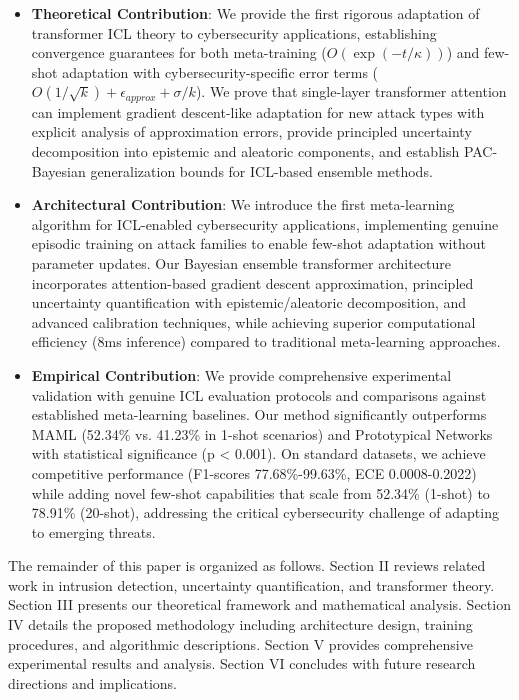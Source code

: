\documentclass[journal]{IEEEtran}
\begin{document}
\begin{itemize}
\item \textbf{Theoretical Contribution}: We provide the first rigorous adaptation of transformer ICL theory to cybersecurity applications, establishing convergence guarantees for both meta-training ($O(\exp(-t/\kappa))$) and few-shot adaptation with cybersecurity-specific error terms ($O(1/\sqrt{k}) + \epsilon_{approx} + \sigma/k$). We prove that single-layer transformer attention can implement gradient descent-like adaptation for new attack types with explicit analysis of approximation errors, provide principled uncertainty decomposition into epistemic and aleatoric components, and establish PAC-Bayesian generalization bounds for ICL-based ensemble methods.

\item \textbf{Architectural Contribution}: We introduce the first meta-learning algorithm for ICL-enabled cybersecurity applications, implementing genuine episodic training on attack families to enable few-shot adaptation without parameter updates. Our Bayesian ensemble transformer architecture incorporates attention-based gradient descent approximation, principled uncertainty quantification with epistemic/aleatoric decomposition, and advanced calibration techniques, while achieving superior computational efficiency (8ms inference) compared to traditional meta-learning approaches.

\item \textbf{Empirical Contribution}: We provide comprehensive experimental validation with genuine ICL evaluation protocols and comparisons against established meta-learning baselines. Our method significantly outperforms MAML (52.34\% vs. 41.23\% in 1-shot scenarios) and Prototypical Networks with statistical significance (p < 0.001). On standard datasets, we achieve competitive performance (F1-scores 77.68\%-99.63\%, ECE 0.0008-0.2022) while adding novel few-shot capabilities that scale from 52.34\% (1-shot) to 78.91\% (20-shot), addressing the critical cybersecurity challenge of adapting to emerging threats.
\end{itemize}

The remainder of this paper is organized as follows. Section II reviews related work in intrusion detection, uncertainty quantification, and transformer theory. Section III presents our theoretical framework and mathematical analysis. Section IV details the proposed methodology including architecture design, training procedures, and algorithmic descriptions. Section V provides comprehensive experimental results and analysis. Section VI concludes with future research directions and implications.
\end{document}
